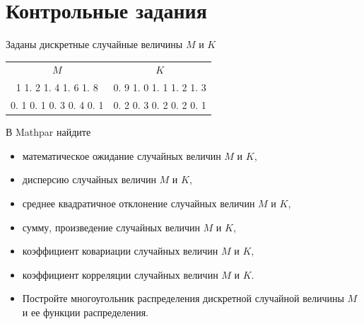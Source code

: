 \section{Контрольные задания}
Заданы дискретные случайные величины $M$ и $K$\\
\begin{tabular}{c|c}
$M$&$K$\\
1 \hspace*{3mm} 1. 2 \hspace*{3mm} 1. 4 \hspace*{3mm} 1. 6 \hspace*{3mm} 1. 8\hspace*{3mm} & \hspace*{3mm} 0. 9 \hspace*{3mm} 1. 0 \hspace*{3mm} 1. 1 \hspace*{3mm} 1. 2 \hspace*{3mm} 1. 3\\
0. 1 \hspace*{1mm} 0. 1 \hspace*{3mm} 0. 3 \hspace*{3mm} 0. 4 \hspace*{3mm} 0. 1\hspace*{3mm} & \hspace*{3mm} 0. 2 \hspace*{3mm} 0. 3 \hspace*{3mm} 0. 2 \hspace*{3mm} 0. 2 \hspace*{5mm} 0. 1\\
\end{tabular}

В Mathpar найдите

\begin{itemize}
  \item математическое ожидание случайных величин $M$ и $K$, 
  \item дисперсию  случайных величин $M$ и $K$, 
  \item среднее квадратичное отклонение  случайных величин $M$ и $K$, 
  \item сумму,  произведение  случайных величин $M$ и $K$, 
  \item коэффициент ковариации  случайных величин $M$ и $K$, 
  \item коэффициент корреляции  случайных величин $M$ и $K$. 
  \item Постройте многоугольник распределения дискретной случайной величины $M$ и ее функции распределения. 
\end{itemize}
